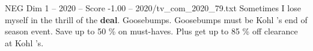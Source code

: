 \begin{textsample}{NEG Dim 1 – 2020 – Score -1.00 – 2020/tv\_com\_2020\_79.txt}  \label{ex:f1_neg_014}
Sometimes I lose myself in the thrill of the \textbf{deal}.
Goosebumps.
Goosebumps must be Kohl 's end of season event.
Save up to 50 \% on must-haves.
Plus get up to 85 \% off clearance at Kohl 's.

\end{textsample}
